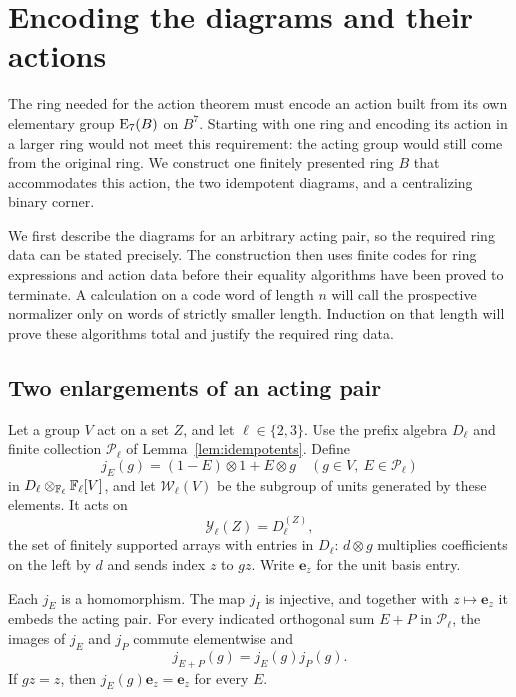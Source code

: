 \section{Encoding the diagrams and their actions}\label{sec:encoding}

The ring needed for the action theorem must encode an action built
from its own elementary group $\mathrm E_7(B)$ on $B^7$.  Starting with one
ring and encoding its action in a larger ring would not meet this
requirement: the acting group would still come from the original ring.
We construct one finitely presented ring $B$ that accommodates this
action, the two idempotent diagrams, and a centralizing binary corner.

We first describe the diagrams for an arbitrary acting pair, so the
required ring data can be stated precisely.  The construction then
uses finite codes for ring expressions and action data before their
equality algorithms have been proved to terminate.  A calculation
on a code word of length $n$ will call the prospective normalizer
only on words of strictly smaller length.  Induction on that length
will prove these algorithms total and justify the required ring data.

\subsection{Two enlargements of an acting pair}

Let a group $V$ act on a set $Z$, and let $\ell\in\{2,3\}$.  Use
the prefix algebra $D_\ell$ and finite collection $\mathcal P_\ell$
of Lemma~\ref{lem:idempotents}.  Define
\begin{equation}\label{eq:enlargement-map}
 j_E(g)=(1-E)\otimes1+E\otimes g
 \quad(g\in V,\ E\in\mathcal P_\ell)
\end{equation}
in $D_\ell\otimes_{\mathbb F_\ell}\mathbb F_\ell[V]$, and let
$\mathcal W_\ell(V)$ be the subgroup of units generated by these
elements.  It acts on
\[
 \mathcal Y_\ell(Z)=D_\ell^{(Z)},
\]
the set of finitely supported arrays with entries in $D_\ell$:
$d\otimes g$ multiplies coefficients on the left by $d$ and sends
index $z$ to $gz$.  Write $\mathbf e_z$ for the unit basis entry.

\begin{lemma}\label{lem:enlargement}
Each $j_E$ is a homomorphism.  The map $j_I$ is injective, and
together with $z\mapsto\mathbf e_z$ it embeds the acting pair.
For every indicated orthogonal sum $E+P$ in $\mathcal P_\ell$,
the images of $j_E$ and $j_P$ commute elementwise and
\[
 j_{E+P}(g)=j_E(g)j_P(g).
\]
If $gz=z$, then $j_E(g)\mathbf e_z=\mathbf e_z$ for every $E$.
\end{lemma}

